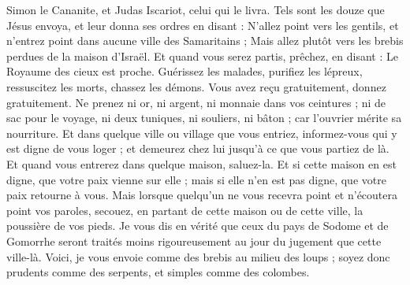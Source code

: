 \begin{multicols}{2}
Simon le Cananite, et Judas Iscariot, celui qui le livra.
Tels sont les douze que Jésus envoya, et leur donna ses ordres en disant : N'allez point vers les gentils, et n'entrez point dans aucune ville des Samaritains ;
Mais allez plutôt vers les brebis perdues de la maison d'Israël.
Et quand vous serez partis, prêchez, en disant : Le Royaume des cieux est proche.
Guérissez les malades, purifiez les lépreux, ressuscitez les morts, chassez les démons. Vous avez reçu gratuitement, donnez gratuitement{}.
Ne prenez ni or, ni argent, ni monnaie dans vos ceintures ;
ni de sac pour le voyage, ni deux tuniques, ni souliers, ni bâton ; car l'ouvrier mérite sa nourriture.
Et dans quelque ville ou village que vous entriez, informez-vous qui y est digne de vous loger ; et demeurez chez lui jusqu'à ce que vous partiez de là.
Et quand vous entrerez dans quelque maison, saluez-la.
Et si cette maison en est digne, que votre paix vienne sur elle ; mais si elle n'en est pas digne, que votre paix retourne à vous.
Mais lorsque quelqu'un ne vous recevra point et n'écoutera point vos paroles, secouez, en partant de cette maison ou de cette ville, la poussière de vos pieds.
Je vous dis en vérité que ceux du pays de Sodome et de Gomorrhe seront traités moins rigoureusement au jour du jugement que cette ville-là.
Voici, je vous envoie comme des brebis au milieu des loups ; soyez donc prudents comme des serpents, et simples comme des colombes.

\end{multicols}
